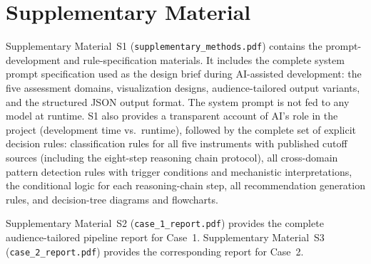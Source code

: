\documentclass[11pt,a4paper]{article}
\begin{document}
\section*{Supplementary Material}

Supplementary Material~S1 (\texttt{supplementary\_methods.pdf}) contains the prompt-development and rule-specification materials. It includes the complete system prompt specification used as the design brief during AI-assisted development: the five assessment domains, visualization designs, audience-tailored output variants, and the structured JSON output format. The system prompt is not fed to any model at runtime. S1 also provides a transparent account of AI's role in the project (development time vs.\ runtime), followed by the complete set of explicit decision rules: classification rules for all five instruments with published cutoff sources (including the eight-step reasoning chain protocol), all cross-domain pattern detection rules with trigger conditions and mechanistic interpretations, the conditional logic for each reasoning-chain step, all recommendation generation rules, and decision-tree diagrams and flowcharts.

Supplementary Material~S2 (\texttt{case\_1\_report.pdf}) provides the complete audience-tailored pipeline report for Case~1. Supplementary Material~S3 (\texttt{case\_2\_report.pdf}) provides the corresponding report for Case~2.

\clearpage
\begingroup
\small
{}
\raggedright
\sloppy
\printbibliography
\endgroup
\end{document}
